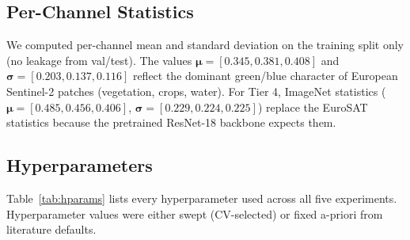 \documentclass[10pt,letterpaper]{article}
\begin{document}
\subsection{Per-Channel Statistics}
We computed per-channel mean and standard deviation on the training split only (no leakage from val/test). The values $\boldsymbol\mu = [0.345, 0.381, 0.408]$ and $\boldsymbol\sigma = [0.203, 0.137, 0.116]$ reflect the dominant green/blue character of European Sentinel-2 patches (vegetation, crops, water). For Tier 4, ImageNet statistics ($\boldsymbol\mu = [0.485, 0.456, 0.406]$, $\boldsymbol\sigma = [0.229, 0.224, 0.225]$) replace the EuroSAT statistics because the pretrained ResNet-18 backbone expects them.

\subsection{Hyperparameters}
Table~\ref{tab:hparams} lists every hyperparameter used across all five experiments. Hyperparameter values were either swept (CV-selected) or fixed a-priori from literature defaults.
\end{document}
